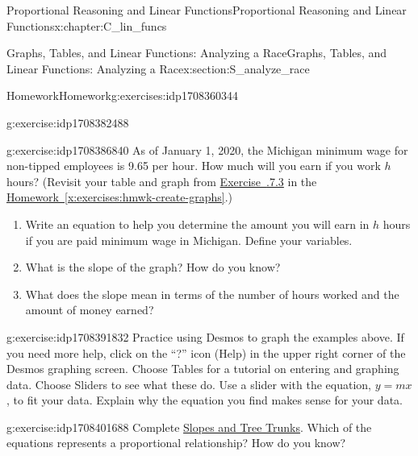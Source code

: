 \documentclass[oneside,10pt,]{book}
\newcommand{\xreffont}{\relax}
\numberwithin{equation}{chapter}
\begin{document}
\begin{chapterptx}{Proportional Reasoning and Linear Functions}{}{Proportional Reasoning and Linear Functions}{}{}{x:chapter:C_lin_funcs}
\begin{sectionptx}{Graphs, Tables, and Linear Functions: Analyzing a Race}{}{Graphs, Tables, and Linear Functions: Analyzing a Race}{}{}{x:section:S_analyze_race}
\begin{exercises-subsection}{Homework}{}{Homework}{}{}{g:exercises:idp1708360344}
\begin{divisionexercise}{5}{}{}{g:exercise:idp1708382488}
\begin{enumerate}[font=\bfseries,label=(\alph*),ref=\alph*]
\end{enumerate}
\end{divisionexercise}%
%
%
\begin{divisionexercise}{6}{}{}{g:exercise:idp1708386840}%
As of January 1, 2020, the Michigan minimum wage for non-tipped employees is \textdollar{}9.65 per hour. How much will you earn if you work \(h\) hours? (Revisit your table and graph from \hyperlink{x:exercise:exer-wages-22}{Exercise~{\xreffont 2.2.7.3}} in the \hyperref[x:exercises:hmwk-create-graphs]{Homework~{\xreffont\ref{x:exercises:hmwk-create-graphs}}}.)%
\begin{enumerate}[font=\bfseries,label=(\alph*),ref=\alph*]
\item{}Write an equation to help you determine the amount you will earn in \(h\) hours if you are paid minimum wage in Michigan. Define your variables.%
\item{}What is the slope of the graph? How do you know?%
\item{}What does the slope mean in terms of the number of hours worked and the amount of money earned?%
\end{enumerate}
\end{divisionexercise}%
\begin{divisionexercise}{7}{}{}{g:exercise:idp1708391832}%
Practice using Desmos to graph the examples above. If you need more help, click on the ``?'' icon (Help) in the upper right corner of the Desmos graphing screen. Choose Tables for a tutorial on entering and graphing data. Choose Sliders to see what these do. Use a slider with the equation, \(y = mx\), to fit your data. Explain why the equation you find makes sense for your data.%
\end{divisionexercise}%
\begin{divisionexercise}{8}{}{}{g:exercise:idp1708401688}%
Complete \hyperref[x:worksheet:act-slope-trees]{Slopes and Tree Trunks}. Which of the equations represents a proportional relationship? How do you know?%
\end{divisionexercise}%
\end{exercises-subsection}
%
%
\typeout{************************************************}

\end{sectionptx}
\end{chapterptx}
\end{document}
